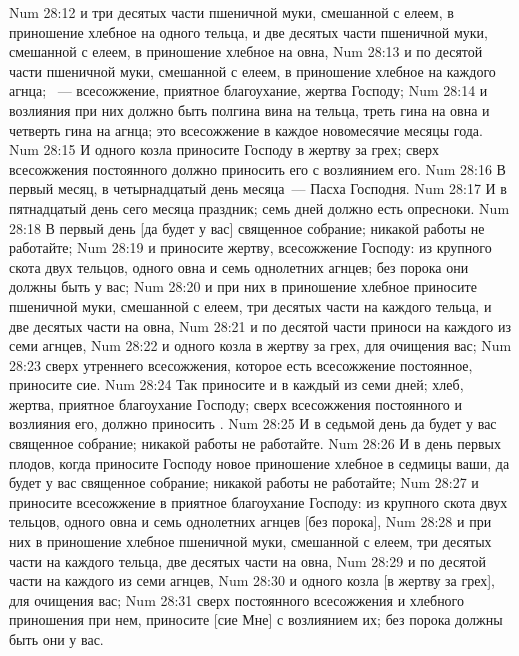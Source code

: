 \vs Num 28:12 и три десятых части  пшеничной муки, смешанной с елеем, в приношение хлебное на одного тельца, и две десятых части  пшеничной муки, смешанной с елеем, в приношение хлебное на овна,
\vs Num 28:13 и по десятой части  пшеничной муки, смешанной с елеем, в приношение хлебное на каждого агнца; ~--- всесожжение, приятное благоухание, жертва Господу;
\vs Num 28:14 и возлияния при них должно быть полгина вина на тельца, треть гина на овна и четверть гина на агнца; это всесожжение в каждое новомесячие  месяцы года.
\vs Num 28:15 И одного козла приносите Господу в жертву за грех; сверх всесожжения постоянного должно приносить его с возлиянием его.
\rsbpar\vs Num 28:16 В первый месяц, в четырнадцатый день месяца~--- Пасха Господня.
\vs Num 28:17 И в пятнадцатый день сего месяца праздник; семь дней должно есть опресноки.
\vs Num 28:18 В первый день [да будет у вас] священное собрание; никакой работы не работайте;
\vs Num 28:19 и приносите жертву, всесожжение Господу: из крупного скота двух тельцов, одного овна и семь однолетних агнцев; без порока они должны быть у вас;
\vs Num 28:20 и при них в приношение хлебное приносите пшеничной муки, смешанной с елеем, три десятых части  на каждого тельца, и две десятых части  на овна,
\vs Num 28:21 и по десятой части  приноси на каждого из семи агнцев,
\vs Num 28:22 и одного козла в жертву за грех, для очищения вас;
\vs Num 28:23 сверх утреннего всесожжения, которое есть всесожжение постоянное, приносите сие.
\vs Num 28:24 Так приносите и в каждый из семи дней;  хлеб, жертва, приятное благоухание Господу; сверх всесожжения постоянного и возлияния его, должно приносить .
\vs Num 28:25 И в седьмой день да будет у вас священное собрание; никакой работы не работайте.
\vs Num 28:26 И в день первых плодов, когда приносите Господу новое приношение хлебное в седмицы ваши, да будет у вас священное собрание; никакой работы не работайте;
\vs Num 28:27 и приносите всесожжение в приятное благоухание Господу: из крупного скота двух тельцов, одного овна и семь однолетних агнцев [без порока],
\vs Num 28:28 и при них в приношение хлебное пшеничной муки, смешанной с елеем, три десятых части  на каждого тельца, две десятых части  на овна,
\vs Num 28:29 и по десятой части  на каждого из семи агнцев,
\vs Num 28:30 и одного козла [в жертву за грех], для очищения вас;
\vs Num 28:31 сверх постоянного всесожжения и хлебного приношения при нем, приносите [сие Мне] с возлиянием их; без порока должны быть они у вас.
